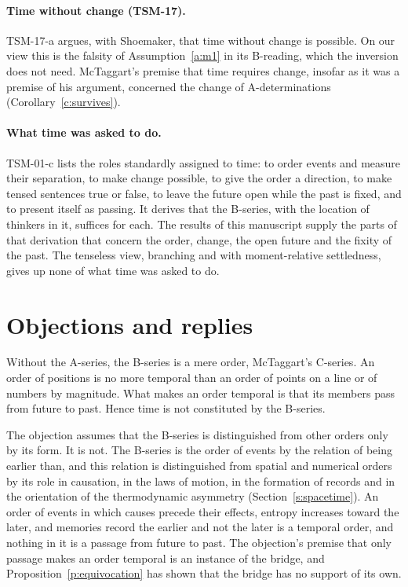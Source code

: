 \documentclass{situationist-preprint}
\begin{document}
\paragraph{Time without change (TSM-17).} TSM-17-a argues, with Shoemaker, that time without change is possible. On our view this is the falsity of Assumption~\ref{a:m1} in its B-reading, which the inversion does not need. McTaggart's premise that time requires change, insofar as it was a premise of his argument, concerned the change of A-determinations (Corollary~\ref{c:survives}).

\paragraph{What time was asked to do.} TSM-01-c lists the roles standardly assigned to time: to order events and measure their separation, to make change possible, to give the order a direction, to make tensed sentences true or false, to leave the future open while the past is fixed, and to present itself as passing. It derives that the B-series, with the location of thinkers in it, suffices for each. The results of this manuscript supply the parts of that derivation that concern the order, change, the open future and the fixity of the past. The tenseless view, branching and with moment-relative settledness, gives up none of what time was asked to do.

\section{Objections and replies}\label{s:objections}

\begin{objection}\label{o:cseries}
Without the A-series, the B-series is a mere order, McTaggart's C-series. An order of positions is no more temporal than an order of points on a line or of numbers by magnitude. What makes an order temporal is that its members pass from future to past. Hence time is not constituted by the B-series.
\end{objection}

\begin{reply}
The objection assumes that the B-series is distinguished from other orders only by its form. It is not. The B-series is the order of events by the relation of being earlier than, and this relation is distinguished from spatial and numerical orders by its role in causation, in the laws of motion, in the formation of records and in the orientation of the thermodynamic asymmetry (Section~\ref{s:spacetime}). An order of events in which causes precede their effects, entropy increases toward the later, and memories record the earlier and not the later is a temporal order, and nothing in it is a passage from future to past. The objection's premise that only passage makes an order temporal is an instance of the bridge, and Proposition~\ref{p:equivocation} has shown that the bridge has no support of its own.
\end{reply}
\end{document}
